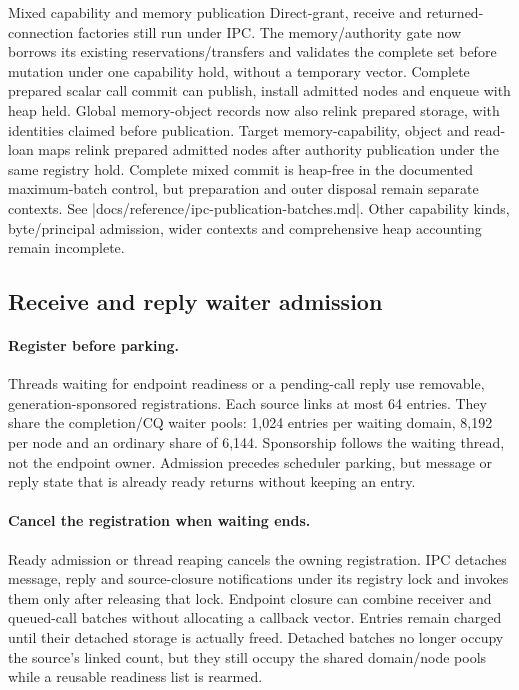 \begin{implementationdetail}{Mixed capability and memory publication}
Direct-grant, receive and returned-connection factories still run under IPC.
The memory/authority gate now borrows its existing reservations/transfers and
validates the complete set before mutation under one capability hold, without
a temporary vector. Complete prepared scalar call commit can publish, install
admitted nodes and enqueue with heap held. Global memory-object records now
also relink prepared storage, with identities claimed before publication.
Target memory-capability, object and read-loan maps relink prepared admitted
nodes after authority publication under the same registry hold. Complete mixed
commit is heap-free in the documented maximum-batch control, but preparation and
outer disposal remain separate contexts. See \repofile|docs/reference/ipc-publication-batches.md|.
Other capability kinds, byte/principal admission, wider contexts and
comprehensive heap accounting remain incomplete.
\end{implementationdetail}

\subsection{Receive and reply waiter admission}

\paragraph*{Register before parking.}

Threads waiting for endpoint readiness or a pending-call reply use removable,
generation-sponsored registrations. Each source links at most 64 entries. They share
the completion/CQ waiter pools: 1,024 entries per waiting domain, 8,192 per node
and an ordinary share of 6,144. Sponsorship follows the waiting thread, not the
endpoint owner. Admission precedes scheduler parking, but message or reply state
that is already ready returns without keeping an entry.

\paragraph*{Cancel the registration when waiting ends.}

Ready admission or thread reaping cancels the owning registration. IPC detaches
message, reply and source-closure notifications under its registry lock and
invokes them only after releasing that lock. Endpoint closure can combine
receiver and queued-call batches without allocating a callback vector. Entries
remain charged until their detached storage is actually freed.
Detached batches no longer occupy the source's linked count, but they still occupy
the shared domain/node pools while a reusable readiness list is rearmed.


